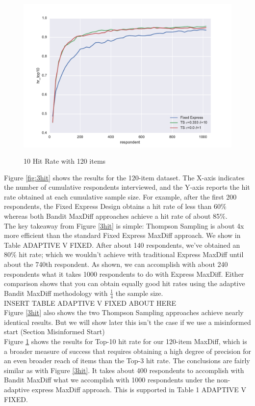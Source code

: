 \documentclass[mksc,blindrev]{informs3} %
\begin{document}
\begin{figure}
\caption{10 Hit Rate with 120 items}
\includegraphics[width=1\textwidth]{plots/10hitrate120show3.pdf}
\label{fig:10hit}
\end{figure}
Figure \ref{fig:3hit} shows the results for the 120-item dataset.  The X-axis indicates the number of cumulative respondents interviewed, and the Y-axis reports the hit rate obtained at each cumulative sample size.  For example, after the first 200 respondents, the Fixed Express Design obtains a hit rate of less than 60\% whereas both Bandit MaxDiff approaches achieve a hit rate of about 85\%.\\
The key takeaway from Figure \ref{3hit} is simple: Thompson Sampling is about 4x more efficient than the standard Fixed Express MaxDiff approach. We show in Table ADAPTIVE V FIXED. After about 140 respondents, we’ve obtained an 80\% hit rate; which we wouldn’t achieve with traditional Express MaxDiff until about the 740th respondent.  As shown, we can accomplish with about 240 respondents what it takes 1000 respondents to do with Express MaxDiff.  Either comparison shows that you can obtain equally good hit rates using the adaptive Bandit MaxDiff methodology with $\frac{1}{4}$ the sample size.\\
INSERT TABLE ADAPTIVE V FIXED ABOUT HERE\\
Figure \ref{3hit} also shows the two Thompson Sampling approaches achieve nearly identical results. But we will show later this isn’t the case if we use a misinformed start (Section Misinformed Start)\\
Figure \ref{fig:10hit} shows the results for Top-10 hit rate for our 120-item MaxDiff, which is a broader measure of success that requires obtaining a high degree of precision for an even broader reach of items than the Top-3 hit rate.  The conclusions are fairly similar as with Figure \ref{3hit}.  It takes about 400 respondents to accomplish with Bandit MaxDiff what we accomplish with 1000 respondents under the non-adaptive express MaxDiff approach. This is supported in Table 1 ADAPTIVE V FIXED. \\
\end{document}
